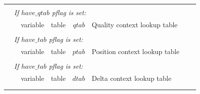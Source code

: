 \documentclass[a4paper]{article}
\begin{document}
\begin{table}
\begin{tabular}{|r|r|r|r|r|p{8cm}|l|l|}
& \multicolumn{6}{l|}{} & \\[-0.5em]
\multicolumn{1}{|l|}{} & \multicolumn{6}{l|}{ \textit{If $have\_qtab$ pflag is set:} } & \\ 
\cline{3-6}
                       &  & variable                   & table          & $qtab$                         & Quality context lookup table & & \\
\cline{3-6}

& \multicolumn{6}{l|}{} & \\[-0.5em]
\multicolumn{1}{|l|}{} & \multicolumn{6}{l|}{ \textit{If $have\_tab$ pflag is set:} } & \\
\cline{3-6}
                       &  & variable                   & table          & $ptab$                         & Position context lookup table & & \\
\cline{3-6}

& \multicolumn{6}{l|}{} & \\[-0.5em]
\multicolumn{1}{|l|}{} & \multicolumn{6}{l|}{ \textit{If $have\_tab$ pflag is set:} } & \\
\cline{3-6}
                       &  & variable                   & table          & $dtab$                         & Delta context lookup table & & \\
\cline{3-6}
& \multicolumn{6}{l|}{} & \\
\cline{2-7}
\multicolumn{8}{|l|}{}\\
\hline
\end{tabular}
\end{table}

% 
% 
% 
% 
\end{document}
